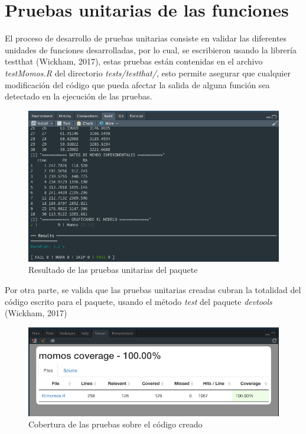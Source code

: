\section{Pruebas unitarias de las funciones}

El proceso de desarrollo de pruebas unitarias consiste en validar las diferentes unidades de funciones desarrolladas, por lo cual, se escribieron usando la librer\'ia testthat (Wickham, 2017), estas pruebas est\'an contenidas en el archivo \textit{testMomos.R} del directorio \textit{tests/testthat/}, esto permite asegurar que cualquier modificaci\'on del c\'odigo que pueda afectar la salida de alguna funci\'on sea detectado en la ejecuci\'on de las pruebas. \\

\begin{figure}[H]
  \centering
    \begin{minipage}{1\textwidth}
      \centering
      \includegraphics[width=1\textwidth]{figure_4_21.png}
      \caption{Resultado de las pruebas unitarias del paquete}
      \label{fig:Fig}
    \end{minipage}%
    \hspace{5mm}
\end{figure}

Por otra parte, se valida que las pruebas unitarias creadas cubran la totalidad del c\'odigo escrito para el paquete, usando el m\'etodo \textit{test} del paquete \textit{devtools} (Wickham, 2017)

\begin{figure}[H]
  \centering
    \begin{minipage}{1\textwidth}
      \centering
      \includegraphics[width=1\textwidth]{figure_4_22.png}
      \caption{Cobertura de las pruebas sobre el c\'odigo creado}
      \label{fig:Fig}
    \end{minipage}%
    \hspace{5mm}
\end{figure}

